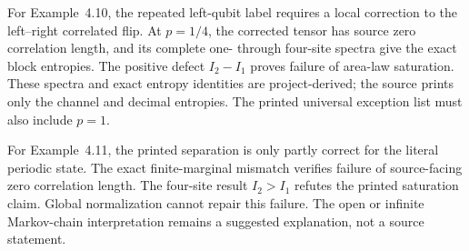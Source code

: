 \documentclass{article}
\begin{document}
For Example~4.10, the repeated left-qubit label requires a local correction to
the left--right correlated flip. At $p=1/4$, the corrected tensor has source
zero correlation length, and its complete one- through four-site spectra give
the exact block entropies. The positive defect $I_2-I_1$ proves failure of
area-law saturation. These spectra and exact entropy identities are
project-derived; the source prints only the channel and decimal entropies. The
printed universal exception list must also include $p=1$.

For Example~4.11, the printed separation is only partly correct for the literal
periodic state. The exact finite-marginal mismatch verifies failure of
source-facing zero correlation length. The four-site result $I_2>I_1$ refutes
the printed saturation claim. Global normalization cannot repair this failure.
The open or infinite Markov-chain interpretation remains a suggested
explanation, not a source statement.



\end{document}
